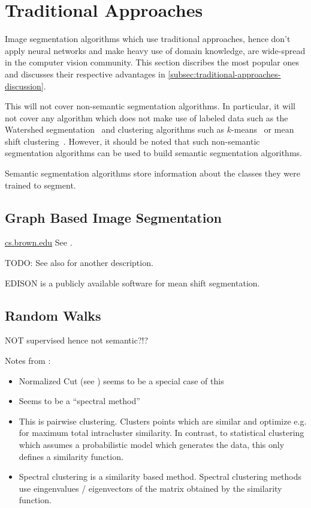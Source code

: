 \section{Traditional Approaches}\label{sec:traditional-approaches}
Image segmentation algorithms which use traditional approaches, hence don't
apply neural networks and make heavy use of domain knowledge, are wide-spread
in the computer vision community. This section discribes the most popular ones
and discusses their respective advantages in
\cref{subsec:traditional-approaches-discussion}.

This will not cover non-semantic segmentation algorithms. In particular, it
will not cover any algorithm which does not make use of labeled data such as
the Watershed segmentation~\cite{beucher1992morphological} and clustering
algorithms such as $k$-means~\cite{hartigan1975clustering} or mean shift
clustering~\cite{comaniciu2002mean}. However, it should be noted that such
non-semantic segmentation algorithms can be used to build semantic segmentation
algorithms.

Semantic segmentation algorithms store information about the classes they were
trained to segment.


\subsection{Graph Based Image Segmentation}\label{subsec:graph-based-image-segmentation}
\href{http://cs.brown.edu/~pff/segment/}{cs.brown.edu}
See \cite{felzenszwalb2004efficient}.

TODO: See also \cite{pantofaru2005comparison} for another description.

EDISON is a publicly available software for mean shift segmentation.\cite{christoudias2002synergism}


\subsection{Random Walks}
NOT supervised hence not semantic?!?

Notes from \cite{meilpa2001learning}:

\begin{itemize}
    \item Normalized Cut (see \cite{shi2000normalized}) seems to be a special
          case of this
    \item Seems to be a \enquote{spectral method}
    \item This is pairwise clustering. Clusters points which are similar and
          optimize e.g. for maximum total intracluster similarity. In contrast,
          to statistical clustering which assumes a probabilistic model which
          generates the data, this only defines a similarity function.
    \item Spectral clustering is a similarity based method. Spectral clustering
          methods use eingenvalues / eigenvectors of the matrix obtained by the
          similarity function.
\end{itemize}


